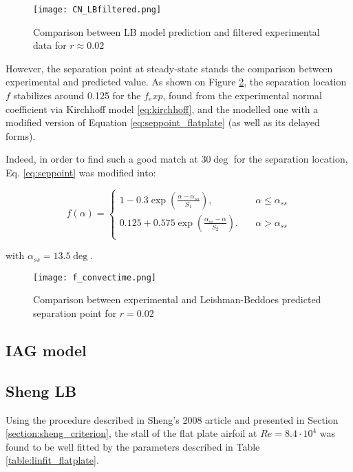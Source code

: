 \begin{figure}[h]
    \centering
    \texttt{[image: CN\_LBfiltered.png]}
    \caption{Comparison between LB model prediction and filtered experimental data for $r\approx 0.02$}
    \label{fig:CN_LBfiltered}
\end{figure}

However, the separation point at steady-state stands the comparison between experimental and predicted value. As shown on Figure \ref{fig:f_convectime}, the separation location $f$ stabilizes around 0.125 for the $f_exp$, found from the experimental normal coefficient via Kirchhoff model \ref{eq:kirchhoff}, and the modelled one with a modified version of Equation \eqref{eq:seppoint_flatplate} (as well as its delayed forms).

Indeed, in order to find such a good match at $30 \deg$ for the separation location, Eq. \eqref{eq:seppoint} was modified into: 

\begin{equation}
	f(\alpha) = 
		\begin{cases}
		1-0.3\exp(\frac{\alpha-\alpha_{ss}}{S_1}), &\quad \alpha \leq \alpha_{ss}\\
		0.125+0.575\exp(\frac{\alpha_{ss}-\alpha}{S_2}). &\quad \alpha > \alpha_{ss}\\
		\end{cases}
	\label{eq:seppoint_flatplate}
\end{equation}

\noindent with $\alpha_{ss} = 13.5 \deg$.

\begin{figure}[h]
    \centering
    \texttt{[image: f\_convectime.png]}
    \caption{Comparison between experimental and Leishman-Beddoes predicted separation point for $r = 0.02$}
    \label{fig:f_convectime}
\end{figure}

\subsection{IAG model}

\subsection{Sheng LB}

Using the procedure described in Sheng's 2008 article \cite{sheng_modified_2008} and presented in Section \ref{section:sheng_criterion}, the stall of the flat plate airfoil at $Re=8.4 \cdot 10^4$ was found to be well fitted by the parameters described in Table \ref{table:linfit_flatplate}.

